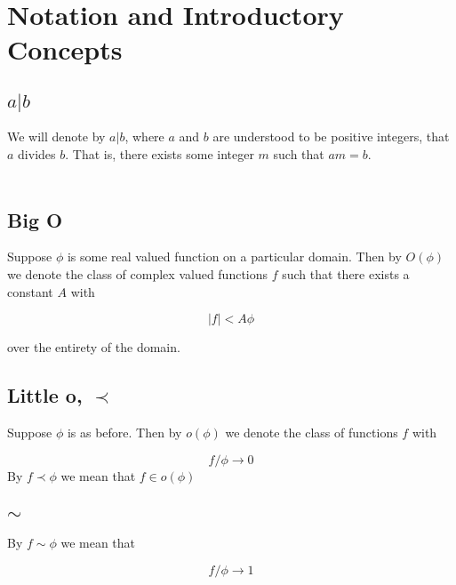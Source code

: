 \section{Notation and Introductory Concepts}

\subsection{$a|b$}

We will denote by $a|b$, where $a$ and $b$ are understood to be positive integers, that $a$ divides $b$. That is, 
there exists some integer $m$ such that $am = b$. \\ \\

\subsection{Big O}

\noi
Suppose $\phi$ is some real valued function on a particular domain. Then by $O(\phi)$ we denote the class of complex valued 
functions $f$ such that there exists a constant $A$ with

\begin{equation*}
    |f| < A\phi
\end{equation*}

\noi
over the entirety of the domain.

\subsection{Little o, $\prec$}
Suppose $\phi$ is as before. Then by $o(\phi)$ we denote the class of functions $f$ with

\begin{equation*}
    f/\phi \to 0
\end{equation*}
\noi
By $f \prec \phi$ we mean that $f \in o(\phi)$

\subsection{$\sim$}
By $f \sim \phi$ we mean that

\begin{equation*}
    f/\phi \to 1
\end{equation*}